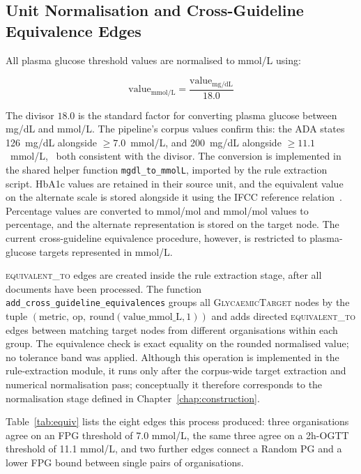 \subsection{Unit Normalisation and Cross-Guideline Equivalence Edges}
\label{sec:unit-norm}

All plasma glucose threshold values are normalised to mmol/L using:

$$\text{value}_{\text{mmol/L}} = \frac{\text{value}_{\text{mg/dL}}}{18.0}$$

The divisor $18.0$ is the standard factor for converting plasma glucose
between mg/dL and mmol/L. The pipeline's corpus values confirm this:
the ADA states 126~mg/dL alongside $\geq 7.0$~mmol/L, and 200~mg/dL
alongside $\geq 11.1$~mmol/L,~\cite{ADA2026} both consistent with the divisor. The conversion is implemented in the shared helper
function \texttt{mgdl\_to\_mmolL}, imported by the rule extraction
script. HbA1c values are retained in their source unit, and the equivalent value on
the alternate scale is stored alongside it using the IFCC reference
relation~\cite{hoelzel2004}. Percentage values are converted to mmol/mol and mmol/mol values to
percentage, and the alternate representation is stored on the target node.
The current cross-guideline equivalence procedure, however, is restricted
to plasma-glucose targets represented in mmol/L.

\textsc{equivalent\_to} edges are created inside the rule extraction stage, after all documents
have been processed. The function \texttt{add\_cross\_guideline\_equivalences}
groups all \textsc{GlycaemicTarget} nodes by the tuple
$(\text{metric},\ \text{op},\ \text{round}(\text{value\_mmol\_L}, 1))$ and
adds directed \textsc{equivalent\_to} edges between matching target nodes
from different organisations within each group. The equivalence
check is exact equality on the rounded normalised value; no tolerance band
was applied. Although this operation is implemented in the rule-extraction
module, it runs only after the corpus-wide target extraction and numerical
normalisation pass; conceptually it therefore corresponds to the
normalisation stage defined in Chapter~\ref{chap:construction}.

Table~\ref{tab:equiv} lists the eight edges this process produced: three
organisations agree on an FPG threshold of 7.0 mmol/L, the same three agree
on a 2h-OGTT threshold of 11.1 mmol/L, and two further edges connect a Random
PG and a lower FPG bound between single pairs of organisations.

